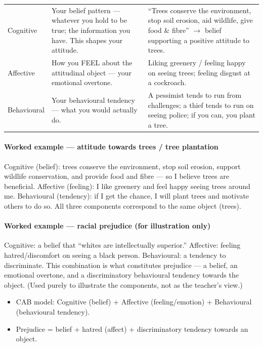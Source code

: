 \begin{center}
\begin{tabularx}{\textwidth}{>{\raggedright\arraybackslash}p{2.4cm} >{\raggedright\arraybackslash}p{4.3cm} Y}
 &  &  \\
\toprule
Cognitive & Your belief pattern --- whatever you hold to be true; the information you have. This shapes your attitude. & ``Trees conserve the environment, stop soil erosion, aid wildlife, give food \& fibre'' $\rightarrow$ belief supporting a positive attitude to trees. \\
Affective & How you FEEL about the attitudinal object --- your emotional overtone. & Liking greenery / feeling happy on seeing trees; feeling disgust at a cockroach. \\
Behavioural & Your behavioural tendency --- what you would actually do. & A pessimist tends to run from challenges; a thief tends to run on seeing police; if you can, you plant a tree. \\
\bottomrule
\end{tabularx}
\end{center}

\paragraph{Worked example --- attitude towards trees / tree plantation} Cognitive (belief): trees conserve the environment, stop soil erosion, support wildlife conservation, and provide food and fibre --- so I believe trees are beneficial. Affective (feeling): I like greenery and feel happy seeing trees around me. Behavioural (tendency): if I get the chance, I will plant trees and motivate others to do so. All three components correspond to the same object (trees).

\paragraph{Worked example --- racial prejudice (for illustration only)} Cognitive: a belief that ``whites are intellectually superior.'' Affective: feeling hatred/discomfort on seeing a black person. Behavioural: a tendency to discriminate. This combination is what constitutes prejudice --- a belief, an emotional overtone, and a discriminatory behavioural tendency towards the object. (Used purely to illustrate the components, not as the teacher's view.)

\begin{KeyConcept}
\begin{itemize}
\item CAB model: Cognitive (belief) + Affective (feeling/emotion) + Behavioural (behavioural tendency).
\item Prejudice = belief + hatred (affect) + discriminatory tendency towards an object.
\end{itemize}
\end{KeyConcept}

